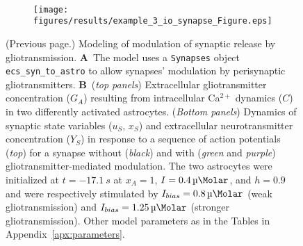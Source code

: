 \documentclass[a4paper, 11pt]{article}
\newcommand*{\appref}[1]{Appendix~\ref{#1}}
\begin{document}
\begin{figure}
\begin{subfigure}[!t]{\textwidth}
\end{subfigure}\\[2ex]
\begin{subfigure}[t]{\textwidth}
	\caption{}
	\centering
	\texttt{[image: figures/results/example\_3\_io\_synapse\_Figure.eps]}
\end{subfigure}
\end{figure}
\addtocounter{figure}{-1}
\begin{figure} [t!]
  \caption{(Previous page.) Modeling of modulation of synaptic release by gliotransmission.
  \textbf{A}~The model uses a \lstinline|Synapses| object \lstinline|ecs_syn_to_astro| to allow synapses' modulation by perisynaptic gliotransmitters.
  \textbf{B}~(\textit{top panels}) Extracellular gliotransmitter concentration ($G_A$) resulting from intracellular Ca$^{2+}$ dynamics ($C$) in two differently activated astrocytes.
  (\textit{Bottom panels}) Dynamics of synaptic state variables ($u_S,\,x_S$) and extracellular neurotransmitter concentration ($Y_S$) in response to a sequence of action potentials (\textit{top}) for a synapse without (\textit{black}) and with (\textit{green} and \textit{purple}) gliotransmitter-mediated modulation.
  The two astrocytes were initialized at $t=\SI{-17.1}{s}$ at $x_A=1$, $I=\SI{0.4}{\micro \Molar}$, and $h=0.9$ and were respectively stimulated by $I_{bias}=\SI{0.8}{\micro \Molar}$ (weak gliotransmission) and $I_{bias}=\SI{1.25}{\micro \Molar}$ (stronger gliotransmission).
  Other model parameters as in the Tables in \appref{apx:parameters}. \label{Fig:io_synapse}}
\end{figure}
\end{document}
